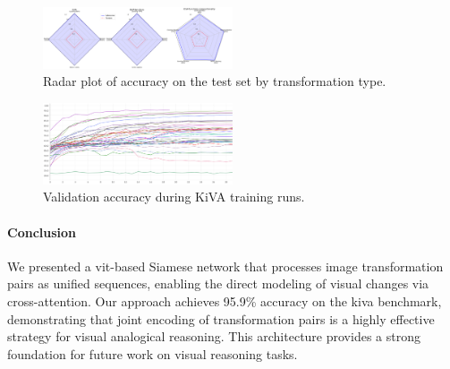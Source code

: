 \documentclass[twocolumn]{article} %
\begin{document}
\begin{figure}[h]\vspace{-0.5\baselineskip}
    \centering
    \includegraphics[width=0.5\textwidth]{figures/combined_radar.png}
    \caption{Radar plot of accuracy on the test set by transformation type.}
    \label{fig:radar_plot}
\end{figure}\vspace{-0.5\baselineskip}

\begin{figure}[h]\vspace{-0.5\baselineskip}
    \centering
    \includegraphics[width=0.5\textwidth]{figures/train_runs.png}
    \caption{Validation accuracy during KiVA training runs.}
    \label{fig:train_runs}
\end{figure}\vspace{-0.5\baselineskip}

\paragraph{Conclusion} We presented a \gls{vit}-based Siamese network that processes image transformation pairs as unified sequences, enabling the direct modeling of visual changes via cross-attention. Our approach achieves 95.9\% accuracy on the \gls{kiva} benchmark, demonstrating that joint encoding of transformation pairs is a highly effective strategy for visual analogical reasoning. This architecture provides a strong foundation for future work on visual reasoning tasks.


\normalsize

\end{document}
